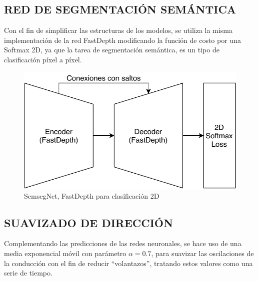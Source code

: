 		\inputminted[frame=lines,
		baselinestretch=1,
		fontsize=\footnotesize,
		autogobble]{python}{codigos/marco-aplicativo/depthnet.py}
		
	\subsection{RED DE SEGMENTACIÓN SEMÁNTICA}
		Con el fin de simplificar las estructuras de los modelos, se utiliza la misma implementación de la red FastDepth modificando la función de costo por una Softmax 2D, ya que la tarea de segmentación semántica, es un tipo de clasificación píxel a píxel.
		
		\begin{figure}[H]
			\centering
			\includegraphics[scale=0.55]{imagenes/semsegnet}
			\caption{SemsegNet, FastDepth para clasificación 2D}
			\label{semsegnet}
		\end{figure}
		
	\subsection{SUAVIZADO DE DIRECCIÓN}
		Complementando las predicciones de las redes neuronales, se hace uso de una media exponencial móvil con parámetro $\alpha=0.7$, para suavizar las oscilaciones de la conducción con el fin de reducir ``volantazos'', tratando estos valores como una serie de tiempo.
		
